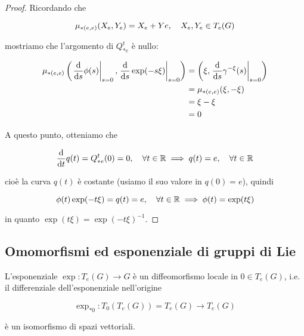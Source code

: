 \begin{proof}
	Ricordando che
	
	\begin{equation}
		\mu_{*(e,e)} (X_{e},Y_{e}) = X_{e} + Y {e} \qcomma X_{e},Y_{e} \in T_{e}(G)
	\end{equation}

	mostriamo che l'argomento di $ Q^{t}_{*e} $ è nullo:
	
	\begin{align}
		\begin{split}
			\mu_{*(e,e)} \left( \eval{ \dv{s} \phi(s) }_{s=0}, \eval{ \dv{s} \exp(-s \xi) }_{s=0} \right) &= \left( \xi, \eval{ \dv{s} \gamma^{-\xi}(s) }_{s=0} \right) \\
			&= \mu_{*(e,e)} (\xi, -\xi) \\
			&= \xi - \xi \\
			&= 0
		\end{split}
	\end{align}

	A questo punto, otteniamo che
	
	\begin{equation}
		\dv{t} q(t) = Q^{t}_{*e} (0) = 0 \qcomma \forall t \in \R \implies q(t) = e \qcomma \forall t \in \R
	\end{equation}

	cioè la curva $ q(t) $ è costante (usiamo il suo valore in $ q(0) = e $), quindi
	
	\begin{equation}
		\phi(t) \exp(-t \xi) = q(t) = e \qcomma \forall t \in \R \implies \phi(t) = \exp(t \xi)
	\end{equation}

	in quanto $ \exp(t \xi) = \exp(-t \xi)^{-1} $.
\end{proof}

\subsection{Omomorfismi ed esponenziale di gruppi di Lie}

\begin{definition}\label{prop:exp-loc-diffeo}
	L'esponenziale $ \exp : T_{e}(G) \to G $ è un diffeomorfismo locale in $ 0 \in T_{e}(G) $, i.e. il differenziale dell'esponenziale nell'origine
	
	\begin{equation}
		\exp_{*0} : T_{0}(T_{e}(G)) = T_{e}(G) \to T_{e}(G)
	\end{equation}

	è un isomorfismo di spazi vettoriali.
\end{definition}

